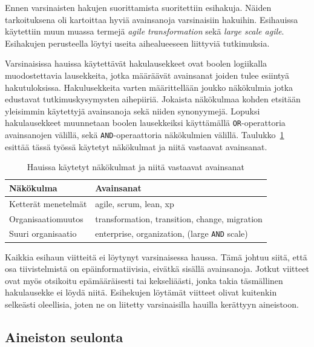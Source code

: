 Ennen varsinaisten hakujen suorittamista suoritettiin esihakuja. Näiden
tarkoituksena oli kartoittaa hyviä avainsanoja varsinaisiin hakuihin. Esihauissa
käytettiin muun muassa termejä \textit{agile transformation} sekä \textit{large
scale agile}. Esihakujen perusteella löytyi useita aihealueeseen liittyviä
tutkimuksia.

Varsinaisissa hauissa käytettävät hakulausekkeet ovat boolen logiikalla
muodostettavia lausekkeita, jotka määräävät avainsanat joiden tulee esiintyä
hakutuloksissa. Hakulusekkeita varten määrittellään joukko näkökulmia jotka
edustavat tutkimuskysymysten aihepiiriä. Jokaista näkökulmaa kohden etsitään
yleisimmin käytettyjä avainsanoja sekä niiden synonyymejä. Lopuksi
hakulausekkeet muunnetaan boolen lausekkeiksi käyttämällä
\texttt{OR}-operattoria avainsanojen välillä, sekä \texttt{AND}-operaattoria
näkökulmien välillä. Taulukko~\ref{table:hakulausekkeet} esittää tässä työssä
käytetyt näkökulmat ja niitä vastaavat avainsanat.

\begin{table}[h]
    \begin{tabular}{|l|l|}
        \hline
        Näkökulma           & Avainsanat   \\ \hline
        Ketterät menetelmät & agile, scrum, lean, xp \\ 
        Organisaatiomuutos  & transformation, transition, change, migration \\
        Suuri organisaatio  & enterprise, organization, (large \texttt{AND} scale) \\
        \hline
    \end{tabular}
	\caption{Hauissa käytetyt näkökulmat ja niitä vastaavat avainsanat}
	\label{table:hakulausekkeet}
\end{table}

Kaikkia esihaun viitteitä ei löytynyt varsinaisessa haussa. Tämä johtuu siitä,
että osa tiivistelmistä on epäinformatiivisia, eivätkä sisällä avainsanoja.
Jotkut viitteet ovat myös otsikoitu epämääräisesti tai kekseliäästi, jonka takia
täsmällinen hakulausekke ei löydä niitä. Esihekujen löytämät viitteet olivat
kuitenkin selkeästi oleellisia, joten ne on liitetty varsinaisilla hauilla
kerättyyn aineistoon.

\subsection{Aineiston seulonta}


